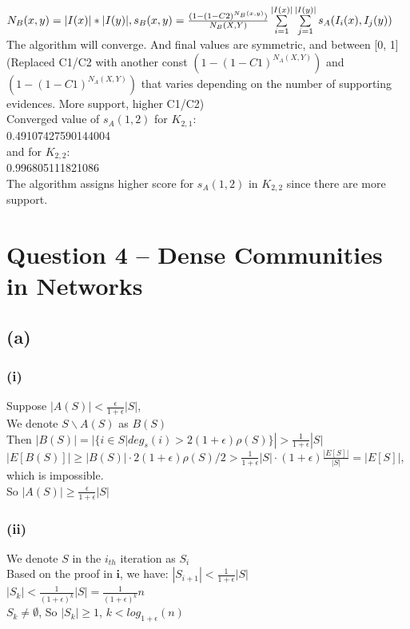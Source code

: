 \documentclass{article}
\begin{document}
$N_B(x, y) = |I(x)| * |I(y)|, \\
s_B(x, y) = \frac{ (1-(1-C2)^{N_B(x, y)})}
 {N_B(X, Y)} \sum\limits_{i=1}^{|I(x)|} \sum\limits_{j=1}^{|I(y)|} 
    s_A(I_i(x), I_j(y))$ \\
    
The algorithm will converge. And final values are symmetric, and between [0, 1](Replaced C1/C2 with another const $(1-(1-C1)^{N_A(X, Y)})$ and $(1-(1-C1)^{N_A(X, Y)})$ that varies depending on the number of supporting evidences. More support, higher C1/C2) \\

Converged value of $s_A(1, 2)$ for $K_{2,1}$: \\
 0.49107427590144004 \\
and for $K_{2,2}$: \\
0.996805111821086 \\

The algorithm assigns higher score for $s_A(1, 2)$ in $K_{2,2}$ since there are more support.

\section{Question 4 -- Dense Communities in Networks}
\subsection{(a)}
\subsubsection{(i)}
Suppose $|A(S)| < \frac{\epsilon}{1+\epsilon}|S|$, \\
We denote $S\backslash A(S)$ as $B(S)$ \\
Then $|B(S)| = |\{i \in S | deg_s(i) > 2(1 + \epsilon)\rho(S)\}| > \frac{1}{1 + \epsilon}|S|$ \\
$|E[B(S)]| \ge |B(S)| \cdot 2(1 + \epsilon)\rho(S)/2 > \frac{1}{1 + \epsilon}|S| \cdot (1 + \epsilon)\frac{|E[S]|}{|S|} = |E[S]|$, which is impossible. \\
So $|A(S)| \ge \frac{\epsilon}{1+\epsilon}|S|$

\subsubsection{(ii)}
We denote $S$ in the $i_{th}$ iteration as $S_i$\\
Based on the proof in $\textbf{i}$, we have: $|S_{i+1}| < \frac{1}{1 + \epsilon}|S|$ \\
$|S_k| < \frac{1}{(1 + \epsilon)^k}|S| = \frac{1}{(1 + \epsilon)^k}n$ \\
 $S_k \ne  \emptyset$, So $|S_k| \ge 1$, $k < log_{1+\epsilon}(n)$
 
\end{document}
